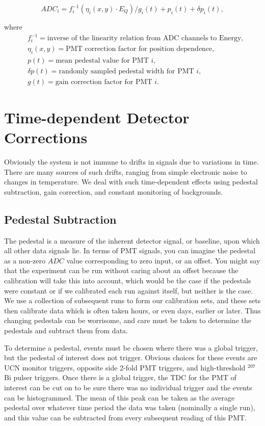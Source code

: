 \begin{equation} \label{eq:pmtResponse}
ADC_i = f_i^{-1}\left(\eta_i(x,y) \cdot E_Q \right)/g_i(t) + p_i(t) + \delta p_i(t) ,
\end{equation}

\noindent where 
\begin{align*}
&f_i^{-1} = \textrm{inverse of the linearity relation from ADC channels to Energy,}\\
&\eta_i(x,y) = \textrm{PMT correction factor for position dependence,} \\
&p(t) = \textrm{mean pedestal value for PMT } i,\\
&\delta p(t) = \textrm{randomly sampled pedestal width for PMT }i,\\
&g(t) = \textrm{gain correction factor for PMT }i.
\end{align*}



\section{Time-dependent Detector Corrections}

Obviously the system is not immune to drifts in signals due to variations
in time. There are many sources of such drifts, ranging from simple
electronic noise to changes in temperature. We deal with such time-dependent
effects using pedestal subtraction, gain correction, and constant monitoring
of backgrounds.

\subsection{Pedestal Subtraction}
The pedestal is a measure of the inherent detector signal, or baseline, 
upon which all other data signals lie. In terms of PMT signals, you can imagine 
the pedestal as a non-zero $ADC$ value corresponding to zero input, or an offset.
You might say that the experiment can be run without caring about an offset
because the calibration will take this into account, which would be the case 
if the pedestals were constant or if we calibrated each run against itself, but 
neither is the case. We use a collection of subsequent runs to form our 
calibration sets, and these sets then calibrate data which is often taken hours,
or even days, earlier or later. Thus changing pedestals can be worrisome, and care
must be taken to determine the pedestals and subtract them from data.

To determine a pedestal, events must be chosen where there was a global trigger, but
the pedestal of interest does not trigger. Obvious choices for these events are
UCN monitor triggers, opposite side 2-fold PMT triggers, and high-threshold $^{207}$Bi
pulser triggers. Once there is a global trigger, the TDC for the PMT of interest can 
be cut on to be sure there was no individual trigger and the events can be 
histogrammed. The mean of this peak can be taken as the average pedestal over whatever
time period the data was taken (nominally a single run), and this value can be 
subtracted from every subsequent reading of this PMT.

